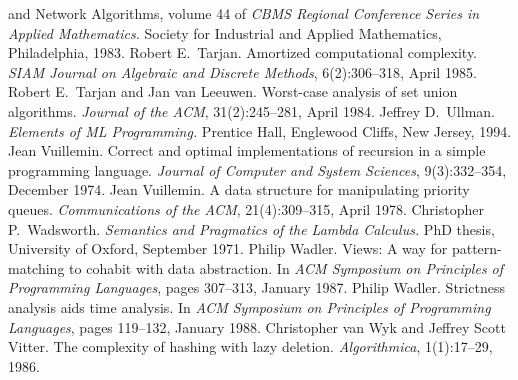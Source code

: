 \begin{thebibliography}{XXXXXXX}
{    and Network Algorithms}, volume 44 of \textit{CBMS Regional
    Conference Series in Applied Mathematics.}\/ Society for
  Industrial and Applied Mathematics, Philadelphia, 1983.
 Robert E.~Tarjan. Amortized computational
  complexity. \textit{SIAM Journal on Algebraic and Discrete Methods},
  6(2):306--318, April 1985.
 Robert E.~Tarjan and Jan van
  Leeuwen. Worst-case analysis of set union
  algorithms. \textit{Journal of the ACM}, 31(2):245--281, April 1984.
 Jeffrey D.~Ullman. \textit{Elements of ML
    Programming.}\/ Prentice Hall, Englewood Cliffs, New Jersey, 1994.
 Jean Vuillemin. Correct and optimal
  implementations of recursion in a simple programming
  language. \textit{Journal of Computer and System Sciences},
  9(3):332--354, December 1974.
 Jean Vuillemin. A data structure for
  manipulating priority queues. \textit{Communications of the ACM},
  21(4):309--315, April 1978.
 Christopher
  P.~Wadsworth. \textit{Semantics and Pragmatics of the Lambda
    Calculus.}\/ PhD thesis, University of Oxford, September 1971.
Philip Wadler. Views: A way for
  pattern-matching to cohabit with data abstraction. In \textit{ACM
    Symposium on Principles of Programming Languages}, pages 307--313,
  January 1987.
 Philip Wadler. Strictness analysis aids
  time analysis. In \textit{ACM Symposium on Principles of Programming
  Languages}, pages 119--132, January 1988.
 Christopher van Wyk and Jeffrey Scott
  Vitter. The complexity of hashing with lazy
  deletion. \textit{Algorithmica}, 1(1):17--29, 1986.
\end{thebibliography}


